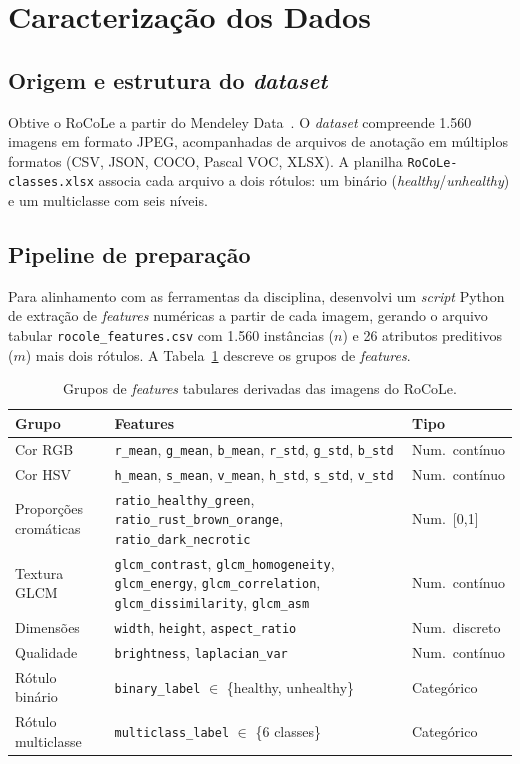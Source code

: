 \documentclass[11pt,a4paper]{article}
\begin{document}
\section{Caracterização dos Dados}

\subsection{Origem e estrutura do \textit{dataset}}

Obtive o RoCoLe a partir do Mendeley Data~\cite{parraga2019}. O \textit{dataset} compreende 1.560 imagens em formato JPEG, acompanhadas de arquivos de anotação em múltiplos formatos (CSV, JSON, COCO, Pascal VOC, XLSX). A planilha \texttt{RoCoLe-classes.xlsx} associa cada arquivo a dois rótulos: um binário (\textit{healthy}/\textit{unhealthy}) e um multiclasse com seis níveis.

\subsection{Pipeline de preparação}

Para alinhamento com as ferramentas da disciplina, desenvolvi um \textit{script} Python de extração de \textit{features} numéricas a partir de cada imagem, gerando o arquivo tabular \texttt{rocole\_features.csv} com 1.560 instâncias ($n$) e 26 atributos preditivos ($m$) mais dois rótulos. A Tabela~\ref{tab:features} descreve os grupos de \textit{features}.

\begin{table}[H]
\centering
\caption{Grupos de \textit{features} tabulares derivadas das imagens do RoCoLe.}
\label{tab:features}
\small
\renewcommand{\arraystretch}{1.15}
\begin{tabularx}{\textwidth}{@{}l X l@{}}
\toprule
\textbf{Grupo} & \textbf{Features} & \textbf{Tipo} \\
\midrule
Cor RGB & \texttt{r\_mean}, \texttt{g\_mean}, \texttt{b\_mean}, \texttt{r\_std}, \texttt{g\_std}, \texttt{b\_std} & Num.\ contínuo \\
Cor HSV & \texttt{h\_mean}, \texttt{s\_mean}, \texttt{v\_mean}, \texttt{h\_std}, \texttt{s\_std}, \texttt{v\_std} & Num.\ contínuo \\
Proporções cromáticas & \texttt{ratio\_healthy\_green}, \texttt{ratio\_rust\_brown\_orange}, \texttt{ratio\_dark\_necrotic} & Num.\ [0,1] \\
Textura GLCM & \texttt{glcm\_contrast}, \texttt{glcm\_homogeneity}, \texttt{glcm\_energy}, \texttt{glcm\_correlation}, \texttt{glcm\_dissimilarity}, \texttt{glcm\_asm} & Num.\ contínuo \\
Dimensões & \texttt{width}, \texttt{height}, \texttt{aspect\_ratio} & Num.\ discreto \\
Qualidade & \texttt{brightness}, \texttt{laplacian\_var} & Num.\ contínuo \\
\midrule
Rótulo binário & \texttt{binary\_label} $\in$ \{healthy, unhealthy\} & Categórico \\
Rótulo multiclasse & \texttt{multiclass\_label} $\in$ \{6 classes\} & Categórico \\
\bottomrule
\end{tabularx}
\end{table}
\end{document}
